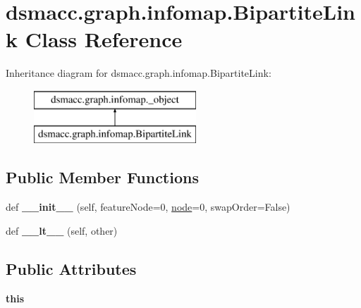 \hypertarget{classdsmacc_1_1graph_1_1infomap_1_1BipartiteLink}{}\section{dsmacc.\+graph.\+infomap.\+Bipartite\+Link Class Reference}
\label{classdsmacc_1_1graph_1_1infomap_1_1BipartiteLink}
Inheritance diagram for dsmacc.\+graph.\+infomap.\+Bipartite\+Link\+:\begin{figure}[H]
\begin{center}
\leavevmode
\includegraphics[height=2.000000cm]{classdsmacc_1_1graph_1_1infomap_1_1BipartiteLink}
\end{center}
\end{figure}
\subsection*{Public Member Functions}
\begin{DoxyCompactItemize}
\item 
\mbox{\label{classdsmacc_1_1graph_1_1infomap_1_1BipartiteLink_a765b3c63a35579d39457d37bb99c635c}} 
def {\bfseries \+\_\+\+\_\+init\+\_\+\+\_\+} (self, feature\+Node=0, \mbox{\hyperlink{structnode}{node}}=0, swap\+Order=False)
\item 
\mbox{\label{classdsmacc_1_1graph_1_1infomap_1_1BipartiteLink_a8b3d12426a77be77c8c9803c77f15099}} 
def {\bfseries \+\_\+\+\_\+lt\+\_\+\+\_\+} (self, other)
\end{DoxyCompactItemize}
\subsection*{Public Attributes}
\begin{DoxyCompactItemize}
\item 
\mbox{\label{classdsmacc_1_1graph_1_1infomap_1_1BipartiteLink_a0f0a7fc84e8bd630b2cf0cafaca94629}} 
{\bfseries this}
\end{DoxyCompactItemize}
